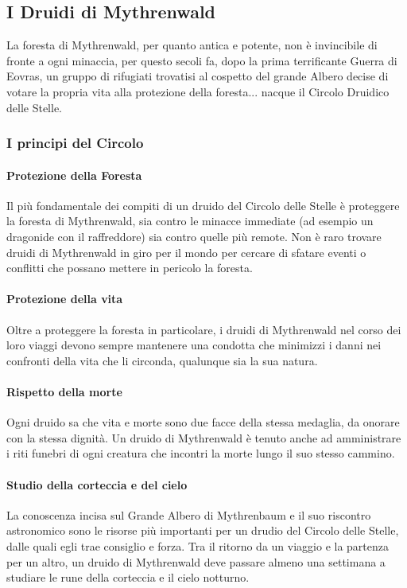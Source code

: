 \subsection{I Druidi di Mythrenwald}

La foresta di Mythrenwald, per quanto antica e potente, non è invincibile di fronte a ogni minaccia, per questo secoli fa, dopo la prima terrificante Guerra di Eovras, un gruppo di rifugiati trovatisi al cospetto del grande Albero decise di votare la propria vita alla protezione della foresta... nacque il Circolo Druidico delle Stelle.

\subsubsection{I principi del Circolo}

\paragraph{Protezione della Foresta} Il più fondamentale dei compiti di un druido del Circolo delle Stelle è proteggere la foresta di Mythrenwald, sia contro le minacce immediate (ad esempio un dragonide con il raffreddore) sia contro quelle più remote. Non è raro trovare druidi di Mythrenwald in giro per il mondo per cercare di sfatare eventi o conflitti che possano mettere in pericolo la foresta.

\paragraph{Protezione della vita} Oltre a proteggere la foresta in particolare, i druidi di Mythrenwald nel corso dei loro viaggi devono sempre mantenere una condotta che minimizzi i danni nei confronti della vita che li circonda, qualunque sia la sua natura.

\paragraph{Rispetto della morte} Ogni druido sa che vita e morte sono due facce della stessa medaglia, da onorare con la stessa dignità. Un druido di Mythrenwald è tenuto anche ad amministrare i riti funebri di ogni creatura che incontri la morte lungo il suo stesso cammino.

\paragraph{Studio della corteccia e del cielo} La conoscenza incisa sul Grande Albero di Mythrenbaum e il suo riscontro astronomico sono le risorse più importanti per un drudio del Circolo delle Stelle, dalle quali egli trae consiglio e forza. Tra il ritorno da un viaggio e la partenza per un altro, un druido di Mythrenwald deve passare almeno una settimana a studiare le rune della corteccia e il cielo notturno.

